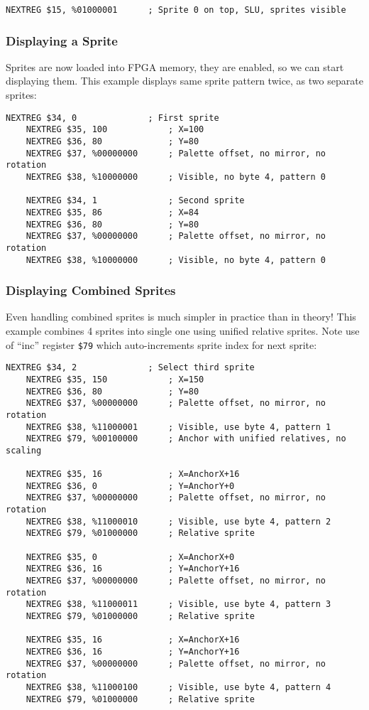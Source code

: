 \documentclass[12pt,twoside,openright,a4paper]{book}
\begin{document}
\begin{Verbatim}[gobble=1]
	NEXTREG $15, %01000001		; Sprite 0 on top, SLU, sprites visible
\end{Verbatim}


\subsubsection{Displaying a Sprite}

Sprites are now loaded into FPGA memory, they are enabled, so we can start displaying them. This example displays same sprite pattern twice, as two separate sprites:

\begin{Verbatim}[gobble=1]
	NEXTREG $34, 0              ; First sprite
	NEXTREG $35, 100            ; X=100
	NEXTREG $36, 80             ; Y=80
	NEXTREG $37, %00000000      ; Palette offset, no mirror, no rotation
	NEXTREG $38, %10000000      ; Visible, no byte 4, pattern 0

	NEXTREG $34, 1              ; Second sprite
	NEXTREG $35, 86             ; X=84
	NEXTREG $36, 80             ; Y=80
	NEXTREG $37, %00000000      ; Palette offset, no mirror, no rotation
	NEXTREG $38, %10000000      ; Visible, no byte 4, pattern 0
\end{Verbatim}


\pagebreak
\subsubsection{Displaying Combined Sprites}

Even handling combined sprites is much simpler in practice than in theory! This example combines 4 sprites into single one using unified relative sprites. Note use of ``inc'' register {\tt \$79} which auto-increments sprite index for next sprite:

\begin{Verbatim}[gobble=1]
	NEXTREG $34, 2              ; Select third sprite
	NEXTREG $35, 150            ; X=150
	NEXTREG $36, 80             ; Y=80
	NEXTREG $37, %00000000      ; Palette offset, no mirror, no rotation
	NEXTREG $38, %11000001      ; Visible, use byte 4, pattern 1
	NEXTREG $79, %00100000      ; Anchor with unified relatives, no scaling

	NEXTREG $35, 16             ; X=AnchorX+16
	NEXTREG $36, 0              ; Y=AnchorY+0
	NEXTREG $37, %00000000      ; Palette offset, no mirror, no rotation
	NEXTREG $38, %11000010      ; Visible, use byte 4, pattern 2
	NEXTREG $79, %01000000      ; Relative sprite

	NEXTREG $35, 0              ; X=AnchorX+0
	NEXTREG $36, 16             ; Y=AnchorY+16
	NEXTREG $37, %00000000      ; Palette offset, no mirror, no rotation
	NEXTREG $38, %11000011      ; Visible, use byte 4, pattern 3
	NEXTREG $79, %01000000      ; Relative sprite

	NEXTREG $35, 16             ; X=AnchorX+16
	NEXTREG $36, 16             ; Y=AnchorY+16
	NEXTREG $37, %00000000      ; Palette offset, no mirror, no rotation
	NEXTREG $38, %11000100      ; Visible, use byte 4, pattern 4
	NEXTREG $79, %01000000      ; Relative sprite
\end{Verbatim}
\end{document}
